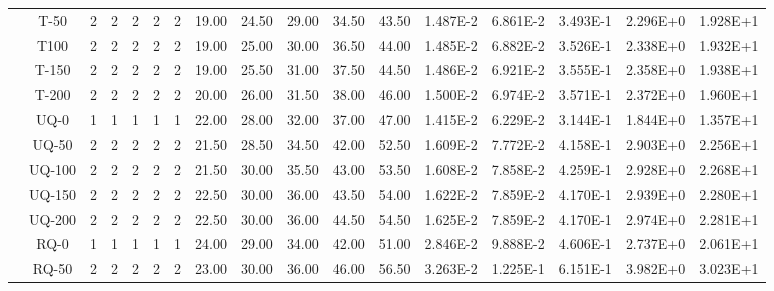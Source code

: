 \begin{table}[ht]
\begin{center}
{\begin{tabular}{cc|c|c|c|c|c|c|c|c|c|c|c|c|c|c|c|}
\multicolumn{1}{|c|}{}                      & \multicolumn{1}{|c|}{T-50} & 	2	&	2	&	2	&	2	&	2	&	19.00	&	24.50	&	29.00	&	34.50	&	43.50	&	1.487E-2	&	6.861E-2	&	3.493E-1	&	2.296E+0	&	1.928E+1	\\
\multicolumn{1}{|c|}{}                      & \multicolumn{1}{|c|}{T100} &	2	&	2	&	2	&	2	&	2	&	19.00	&	25.00	&	30.00	&	36.50	&	44.00	&	1.485E-2	&	6.882E-2	&	3.526E-1	&	2.338E+0	&	1.932E+1	\\
\multicolumn{1}{|c|}{}                      & \multicolumn{1}{|c|}{T-150} &	2	&	2	&	2	&	2	&	2	&	19.00	&	25.50	&	31.00	&	37.50	&	44.50	&	1.486E-2	&	6.921E-2	&	3.555E-1	&	2.358E+0	&	1.938E+1	\\
\multicolumn{1}{|c|}{}                      & \multicolumn{1}{|c|}{T-200} &	2	&	2	&	2	&	2	&	2	&	20.00	&	26.00	&	31.50	&	38.00	&	46.00	&	1.500E-2	&	6.974E-2	&	3.571E-1	&	2.372E+0	&	1.960E+1	\\
\cline{2-17}																														
\multicolumn{1}{|c|}{}                      & \multicolumn{1}{|c|}{UQ-0} &	1	&	1	&	1	&	1	&	1	&	22.00	&	28.00	&	32.00	&	37.00	&	47.00	&	1.415E-2	&	6.229E-2	&	3.144E-1	&	1.844E+0	&	1.357E+1	\\
\multicolumn{1}{|c|}{}                      & \multicolumn{1}{|c|}{UQ-50} &	2	&	2	&	2	&	2	&	2	&	21.50	&	28.50	&	34.50	&	42.00	&	52.50	&	1.609E-2	&	7.772E-2	&	4.158E-1	&	2.903E+0	&	2.256E+1	\\
\multicolumn{1}{|c|}{}                      & \multicolumn{1}{|c|}{UQ-100} &	2	&	2	&	2	&	2	&	2	&	21.50	&	30.00	&	35.50	&	43.00	&	53.50	&	1.608E-2	&	7.858E-2	&	4.259E-1	&	2.928E+0	&	2.268E+1	\\
\multicolumn{1}{|c|}{}                      & \multicolumn{1}{|c|}{UQ-150} &	2	&	2	&	2	&	2	&	2	&	22.50	&	30.00	&	36.00	&	43.50	&	54.00	&	1.622E-2	&	7.859E-2	&	4.170E-1	&	2.939E+0	&	2.280E+1	\\
\multicolumn{1}{|c|}{}                      & \multicolumn{1}{|c|}{UQ-200} &	2	&	2	&	2	&	2	&	2	&	22.50	&	30.00	&	36.00	&	44.50	&	54.50	&	1.625E-2	&	7.859E-2	&	4.170E-1	&	2.974E+0	&	2.281E+1	\\
\cline{2-17}																														
\multicolumn{1}{|c|}{}                      & \multicolumn{1}{|c|}{RQ-0} &	1	&	1	&	1	&	1	&	1	&	24.00	&	29.00	&	34.00	&	42.00	&	51.00	&	2.846E-2	&	9.888E-2	&	4.606E-1	&	2.737E+0	&	2.061E+1	\\
\multicolumn{1}{|c|}{}                      & \multicolumn{1}{|c|}{RQ-50} & 	2	&	2	&	2	&	2	&	2	&	23.00	&	30.00	&	36.00	&	46.00	&	56.50	&	3.263E-2	&	1.225E-1	&	6.151E-1	&	3.982E+0	&	3.023E+1	\\

\end{tabular}}
\end{center}
\end{table}
